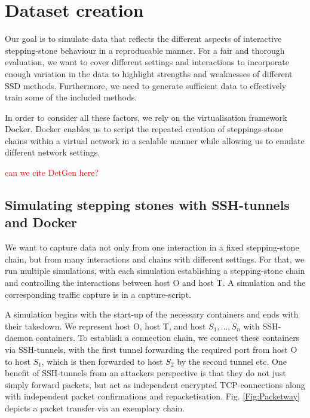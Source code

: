 \documentclass[runningheads]{llncs}\usepackage[]{graphicx}\usepackage[]{color}
\begin{document}






\section{Dataset creation}\label{Sec:Datasetcreation}

Our goal is to simulate data that reflects the different aspects of interactive stepping-stone behaviour in a reproducable manner. For a fair and thorough evaluation, we want to cover different settings and interactions to incorporate enough variation in the data to highlight strengths and weaknesses of different SSD methods. Furthermore, we need to generate sufficient data to effectively train some of the included methods. 

In order to consider all these factors, we rely on the virtualisation framework Docker. Docker enables us to script the repeated creation of steppings-stone chains within a virtual network in a scalable manner while allowing us to emulate different network settings. %

\textcolor{red}{can we cite DetGen here?}

\subsection{Simulating stepping stones with SSH-tunnels and Docker}\label{Sec:Setup}

We want to capture data not only from one interaction in a fixed stepping-stone chain, but from many interactions and chains with different settings. For that, we run multiple simulations, with each simulation establishing a stepping-stone chain and controlling the interactions between host O and host T. A simulation and the corresponding traffic capture is in a capture-script. 

A simulation begins with the start-up of the necessary containers and ends with their takedown. We represent host O, host T, and host $S_1,\dots,S_n$ with SSH-daemon containers.  To establish a connection chain, we connect these containers via SSH-tunnels, with the first tunnel forwarding the required port from host O to host $S_1$, which is then forwarded to host $S_2$ by the second tunnel etc. One benefit of SSH-tunnels from an attackers perspective is that they do not just simply forward packets, but act as independent encrypted TCP-connections along with independent packet confirmations and repacketisation.  Fig. \ref{Fig:Packetway} depicts a packet transfer via an exemplary chain. 
\end{document}
